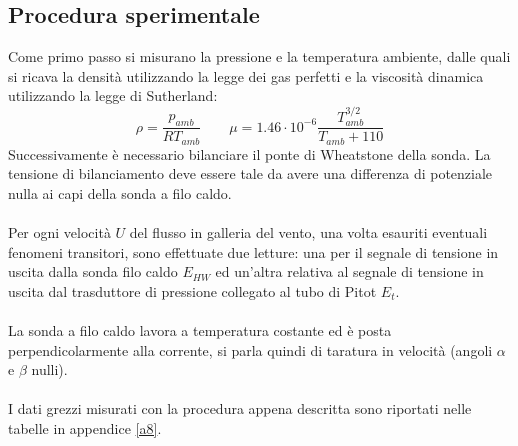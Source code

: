 \newpage
\subsection{Procedura sperimentale}
Come primo passo si misurano la pressione e la temperatura ambiente, dalle quali si ricava la densità utilizzando la legge dei gas perfetti e la viscosità dinamica utilizzando la legge di Sutherland:
\begin{equation*}
    \rho = \frac{p_{amb}}{RT_{amb}} \qquad \mu = 1.46\cdot10^{-6} \frac{T_{amb}^{3/2}}{T_{amb}+110} 
\end{equation*}
Successivamente è necessario bilanciare il ponte di Wheatstone della sonda. La tensione di bilanciamento deve essere tale da avere una differenza di potenziale nulla ai capi della sonda a filo caldo.\\\\
Per ogni velocità $U$ del flusso in galleria del vento, una volta esauriti eventuali fenomeni transitori, sono effettuate due letture: una per il segnale di tensione in uscita dalla sonda filo caldo $E_{HW}$ ed un'altra relativa al segnale di tensione in uscita dal trasduttore di pressione collegato al tubo di Pitot $E_t$.\\\\
La sonda a filo caldo lavora a temperatura costante ed è posta perpendicolarmente alla corrente, si parla quindi di taratura in velocità (angoli $\alpha$ e $\beta$ nulli).\\\\
I dati grezzi misurati con la procedura appena descritta sono riportati nelle tabelle in appendice \ref{a8}.

